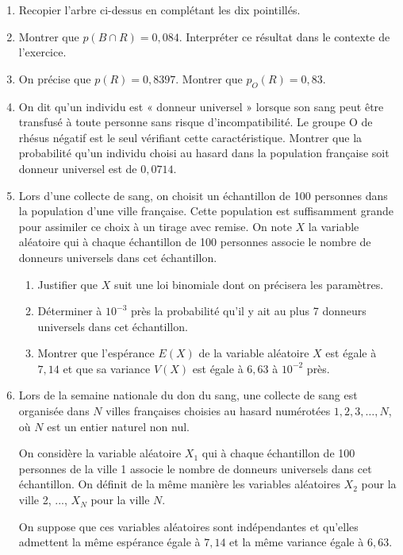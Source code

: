 \documentclass[11pt,a4paper]{article}
\begin{document}
\begin{enumerate}
  \item Recopier l'arbre ci-dessus en complétant les dix pointillés.
\item Montrer que $p(B\cap R)=0{,}084$. Interpréter ce résultat dans le contexte de l'exercice.
\item On précise que $p(R)=0{,}8397$. Montrer que $p_O(R)=0{,}83$.
\item On dit qu'un individu est « donneur universel » lorsque son sang peut être transfusé à toute personne sans risque d'incompatibilité. Le groupe O de rhésus négatif est le seul vérifiant cette caractéristique. Montrer que la probabilité qu'un individu choisi au hasard dans la population française soit donneur universel est de $0{,}0714$.
\item Lors d'une collecte de sang, on choisit un échantillon de 100 personnes dans la population d'une ville française. Cette population est suffisamment grande pour assimiler ce choix à un tirage avec remise. On note $X$ la variable aléatoire qui à chaque échantillon de 100 personnes associe le nombre de donneurs universels dans cet échantillon.
  \begin{enumerate}
    \item Justifier que $X$ suit une loi binomiale dont on précisera les paramètres.
    \item Déterminer à $10^{-3}$ près la probabilité qu'il y ait au plus 7 donneurs universels dans cet échantillon.
    \item Montrer que l'espérance $E(X)$ de la variable aléatoire $X$ est égale à $7{,}14$ et que sa variance $V(X)$ est égale à $6{,}63$ à $10^{-2}$ près.
  \end{enumerate}
\item Lors de la semaine nationale du don du sang, une collecte de sang est organisée dans $N$ villes françaises choisies au hasard numérotées $1,2,3,\ldots,N$, où $N$ est un entier naturel non nul.

  On considère la variable aléatoire $X_1$ qui à chaque échantillon de 100 personnes de la ville 1 associe le nombre de donneurs universels dans cet échantillon. On définit de la même manière les variables aléatoires $X_2$ pour la ville 2, ..., $X_N$ pour la ville $N$.

  On suppose que ces variables aléatoires sont indépendantes et qu'elles admettent la même espérance égale à $7{,}14$ et la même variance égale à $6{,}63$.


\end{enumerate}
\end{document}
